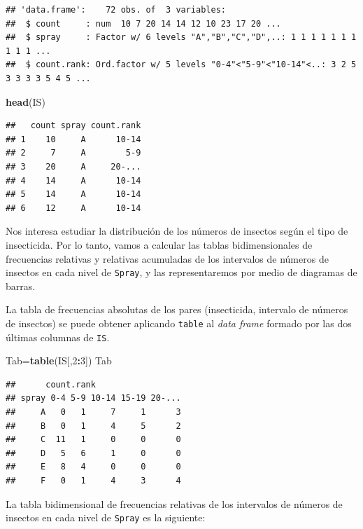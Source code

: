 \documentclass[]{book}
\newenvironment{Shaded}{\begin{snugshade}}{\end{snugshade}}
\newcommand{\DecValTok}[1]{\textcolor[rgb]{0.00,0.00,0.81}{#1}}
\newcommand{\KeywordTok}[1]{\textcolor[rgb]{0.13,0.29,0.53}{\textbf{#1}}}
\newcommand{\NormalTok}[1]{#1}
\newcommand{\OperatorTok}[1]{\textcolor[rgb]{0.81,0.36,0.00}{\textbf{#1}}}
\theoremstyle{definition}
\theoremstyle{definition}
\theoremstyle{definition}
\theoremstyle{remark}
\begin{document}
\begin{verbatim}
## 'data.frame':    72 obs. of  3 variables:
##  $ count     : num  10 7 20 14 14 12 10 23 17 20 ...
##  $ spray     : Factor w/ 6 levels "A","B","C","D",..: 1 1 1 1 1 1 1 1 1 1 ...
##  $ count.rank: Ord.factor w/ 5 levels "0-4"<"5-9"<"10-14"<..: 3 2 5 3 3 3 3 5 4 5 ...
\end{verbatim}

\begin{Shaded}
\begin{Highlighting}[]
\KeywordTok{head}\NormalTok{(IS)}
\end{Highlighting}
\end{Shaded}

\begin{verbatim}
##   count spray count.rank
## 1    10     A      10-14
## 2     7     A        5-9
## 3    20     A     20-...
## 4    14     A      10-14
## 5    14     A      10-14
## 6    12     A      10-14
\end{verbatim}

Nos interesa estudiar la distribución de los números de insectos según el tipo de insecticida. Por lo tanto, vamos a calcular las tablas bidimensionales de frecuencias relativas y relativas acumuladas de los intervalos de números de insectos en cada nivel de \texttt{Spray}, y las representaremos por medio de diagramas de barras.

La tabla de frecuencias absolutas de los pares (insecticida, intervalo de números de insectos) se puede obtener aplicando \texttt{table} al \emph{data frame} formado por las dos últimas columnas de \texttt{IS}.

\begin{Shaded}
\begin{Highlighting}[]
\NormalTok{Tab=}\KeywordTok{table}\NormalTok{(IS[,}\DecValTok{2}\OperatorTok{:}\DecValTok{3}\NormalTok{])}
\NormalTok{Tab}
\end{Highlighting}
\end{Shaded}

\begin{verbatim}
##      count.rank
## spray 0-4 5-9 10-14 15-19 20-...
##     A   0   1     7     1      3
##     B   0   1     4     5      2
##     C  11   1     0     0      0
##     D   5   6     1     0      0
##     E   8   4     0     0      0
##     F   0   1     4     3      4
\end{verbatim}

La tabla bidimensional de frecuencias relativas de los intervalos de números de insectos en cada nivel de \texttt{Spray} es la siguiente:
\end{document}
